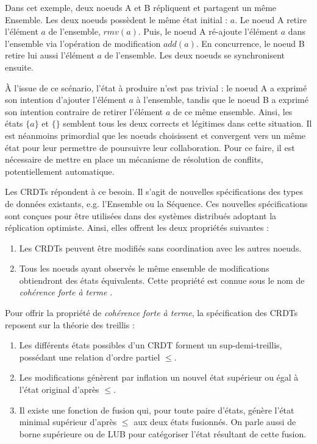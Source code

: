 \documentclass[12pt]{thesul}
\newcommand{\eg}{e.g. }
\newcommand{\trm}[1]{\mathit{#1}}
\begin{document}
Dans cet exemple, deux noeuds A et B répliquent et partagent un même Ensemble.
Les deux noeuds possèdent le même état initial : ${a}$.
Le noeud A retire l'élément $a$ de l'ensemble, $\trm{rmv}(a)$.
Puis, le noeud A ré-ajoute l'élément $a$ dans l'ensemble via l'opération de modification $\trm{add}(a)$.
En concurrence, le noeud B retire lui aussi l'élément $a$ de l'ensemble.
Les deux noeuds se synchronisent ensuite.

À l'issue de ce scénario, l'état à produire n'est pas trivial : le noeud A a exprimé son intention d'ajouter l'élément $a$ à l'ensemble, tandis que le noeud B a exprimé son intention contraire de retirer l'élément $a$ de ce même ensemble.
Ainsi, les états $\{a\}$ et $\{\}$ semblent tous les deux corrects et légitimes dans cette situation.
Il est néanmoins primordial que les noeuds choisissent et convergent vers un même état pour leur permettre de poursuivre leur collaboration.
Pour ce faire, il est nécessaire de mettre en place un mécanisme de résolution de conflits, potentiellement automatique.

Les \acp{CRDT} répondent à ce besoin.
Il s'agit de nouvelles spécifications des types de données existants, \eg l'Ensemble ou la Séquence.
Ces nouvelles spécifications sont conçues pour être utilisées dans des systèmes distribués adoptant la réplication optimiste.
Ainsi, elles offrent les deux propriétés suivantes :

\begin{enumerate}[label=(\roman*)]
  \item Les \acp{CRDT} peuvent être modifiés sans coordination avec les autres noeuds.
  \item Tous les noeuds ayant observés le même ensemble de modifications obtiendront des états équivalents.
    Cette propriété est connue sous le nom de \emph{cohérence forte à terme} .
\end{enumerate}

Pour offrir la propriété de \emph{cohérence forte à terme}, la spécification des \acp{CRDT} reposent sur la théorie des treillis :

\begin{enumerate}[label=(\roman*)]
  \item Les différents états possibles d'un \ac{CRDT} forment un sup-demi-treillis, possédant une relation d'ordre partiel $\leq$.
  \item Les modifications génèrent par inflation un nouvel état supérieur ou égal à l'état original d'après $\leq$.
  \item \label{item:lub} Il existe une fonction de fusion qui, pour toute paire d'états, génère l'état minimal supérieur d'après $\leq$ aux deux états fusionnés.
  On parle aussi de borne supérieure ou de \ac{LUB} pour catégoriser l'état résultant de cette fusion.
\end{enumerate}
\end{document}

